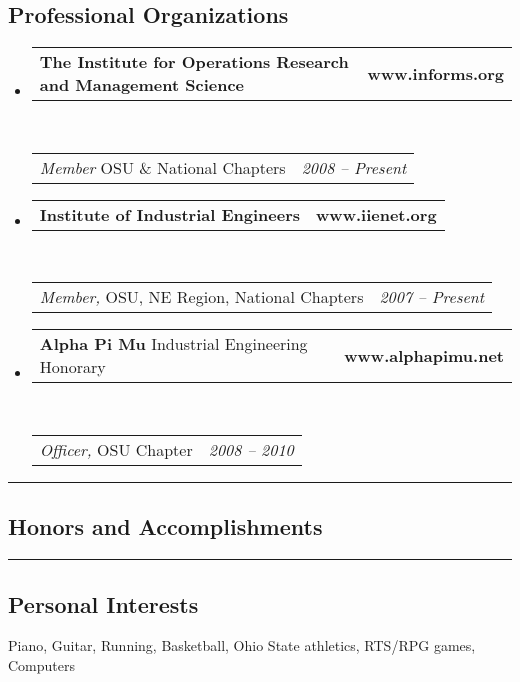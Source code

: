 \documentclass[10pt,letterpaper]{article}
\makeatletter
\newenvironment{indentsection}[1]%
{\begin{list}{}%
	{\setlength{\leftmargin}{#1}}%
	\item[]%
}
{\end{list}}
\newcommand{\headerrow}[2]
{\begin{tabular*}{\linewidth}{l@{\extracolsep{\fill}}r}
	#1 &
	#2 \\
\end{tabular*}}
\makeatother
\begin{document}
\subsection*{Professional Organizations}
\begin{itemize}
	\parskip=0.1em
	\item
	\headerrow
		{\textbf{The Institute for Operations Research and Management Science}}
		{\textbf{www.informs.org}}
	\\
	\headerrow
		{\emph{Member} OSU \& National Chapters}
		{\emph{2008 -- Present}}
	\item
	\headerrow
		{\textbf{Institute of Industrial Engineers}}
		{\textbf{www.iienet.org}}
	\\
	\headerrow
		{\emph{Member,} OSU, NE Region, National Chapters}
		{\emph{2007 -- Present}}
	\item
	\headerrow
		{\textbf{Alpha Pi Mu} Industrial Engineering Honorary}
		{\textbf{www.alphapimu.net}}
	\\
	\headerrow
		{\emph{Officer,} OSU Chapter}
		{\emph{2008 -- 2010}}
\end{itemize}
\hrule
\vspace{-0.4em}
\subsection*{Honors and Accomplishments}

\hrule
\vspace{-0.4em}
\subsection*{Personal Interests}

\begin{indentsection}{\parindent}
Piano, Guitar, Running, Basketball, Ohio State athletics, RTS/RPG games, Computers
\end{indentsection}
\end{document}
